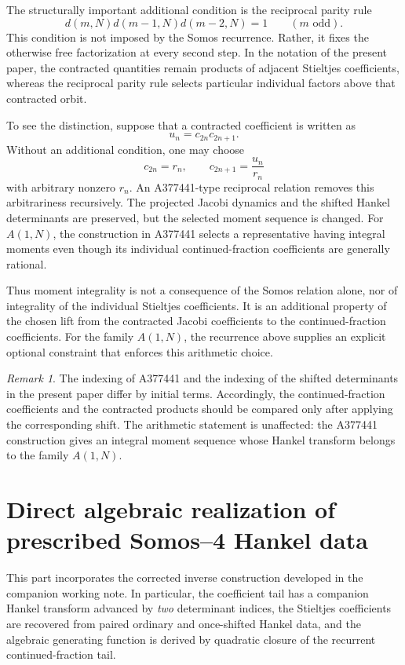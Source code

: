 \documentclass[11pt]{article}
\theoremstyle{remark}
\newtheorem{remark}[theorem]{Remark}
\begin{document}
The structurally important additional condition is the reciprocal parity rule
\begin{equation}
 d(m,N)d(m-1,N)d(m-2,N)=1
 \qquad(m\text{ odd}).
\end{equation}
This condition is not imposed by the Somos recurrence. Rather, it fixes the
otherwise free factorization at every second step. In the notation of the
present paper, the contracted quantities remain products of adjacent
Stieltjes coefficients, whereas the reciprocal parity rule selects particular
individual factors above that contracted orbit.

To see the distinction, suppose that a contracted coefficient is written as
\[
 u_n=c_{2n}c_{2n+1}.
\]
Without an additional condition, one may choose
\[
 c_{2n}=r_n,\qquad c_{2n+1}=\frac{u_n}{r_n}
\]
with arbitrary nonzero $r_n$. An A377441-type reciprocal relation removes
this arbitrariness recursively. The projected Jacobi dynamics and the shifted
Hankel determinants are preserved, but the selected moment sequence is
changed. For $A(1,N)$, the construction in A377441 selects a representative
having integral moments even though its individual continued-fraction
coefficients are generally rational.

Thus moment integrality is not a consequence of the Somos relation alone, nor
of integrality of the individual Stieltjes coefficients. It is an additional
property of the chosen lift from the contracted Jacobi coefficients to the
continued-fraction coefficients. For the family $A(1,N)$, the recurrence above
supplies an explicit optional constraint that enforces this arithmetic choice.

\begin{remark}
The indexing of A377441 and the indexing of the shifted determinants in the
present paper differ by initial terms. Accordingly, the continued-fraction
coefficients and the contracted products should be compared only after
applying the corresponding shift. The arithmetic statement is unaffected:
the A377441 construction gives an integral moment sequence whose Hankel
transform belongs to the family $A(1,N)$.
\end{remark}


\section{Direct algebraic realization of prescribed Somos--4 Hankel data}
\label{sec:direct-realization}
This part incorporates the corrected inverse construction developed in the
companion working note.  In particular, the coefficient tail has a companion
Hankel transform advanced by \emph{two} determinant indices, the Stieltjes
coefficients are recovered from paired ordinary and once-shifted Hankel data,
and the algebraic generating function is derived by quadratic closure of the
recurrent continued-fraction tail.
\end{document}
